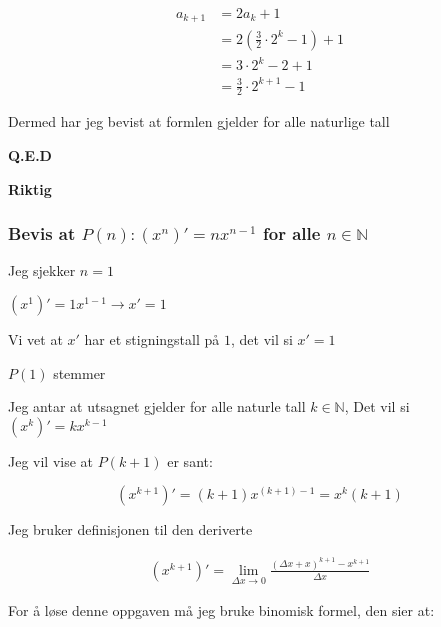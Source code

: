\documentclass{article}
\begin{document}
\begin{align*}
    a_{k+1} &= 2a_k+1 \\
    &= 2(\frac{3}{2} \cdot 2^{k} - 1) + 1 \\
    &= 3 \cdot 2^k - 2 + 1 \\
    &= \frac{3}{2} \cdot 2^{k+1} - 1
\end{align*}

Dermed har jeg bevist at formlen gjelder for alle naturlige tall

\textbf{Q.E.D}

\textbf{Riktig}

\subsubsection{Bevis at $P(n): (x^n)'= nx^{n-1}$ for alle $n \in \mathbb{N}$}

Jeg sjekker $n=1$

$(x^1)'= 1x^{1-1} \rightarrow x'=1$

Vi vet at $x'$ har et stigningstall på $1$, det vil si $x'= 1$

$P(1)$ stemmer

Jeg antar at utsagnet gjelder for alle naturle tall $k \in \mathbb{N}$, Det vil si $(x^k)' = kx^{k-1}$

Jeg vil vise at $P(k+1)$ er sant:

$$(x^{k+1})' = (k+1)x^{(k+1)-1} = x^k(k+1)$$

Jeg bruker definisjonen til den deriverte

\begin{align*}
    (x^{k+1})'=\lim_{\Delta x \rightarrow 0}\frac{(\Delta x + x)^{k+1}-x^{k+1}}{\Delta x}
\end{align*}

For å løse denne oppgaven må jeg bruke binomisk formel, den sier at:
\end{document}
